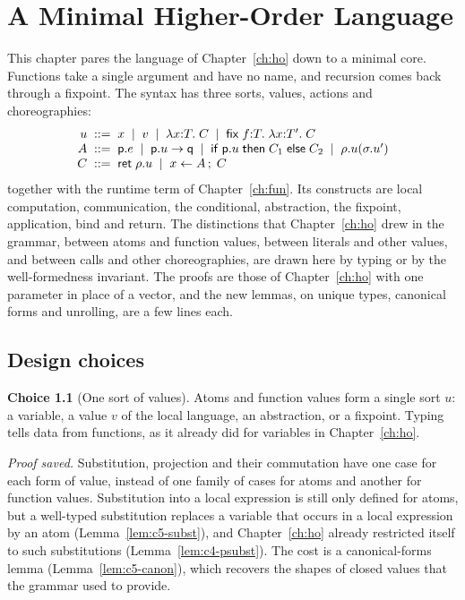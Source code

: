 \documentclass[11pt]{report}
\theoremstyle{plain}
\theoremstyle{definition}
\newtheorem{choice}{Choice}[chapter]
\theoremstyle{remark}
\newcommand{\kw}[1]{\mathsf{#1}}
\newcommand{\pp}{\mathsf{p}}
\newcommand{\qq}{\mathsf{q}}
\newcommand{\bind}[3]{#1 \leftarrow #2\,;\;#3}
\newcommand{\cret}[1]{\kw{ret}\;#1}
\newcommand{\com}[3]{#1.#2 \to #3}
\newcommand{\cif}[4]{\kw{if}\;#1.#2\;\kw{then}\;#3\;\kw{else}\;#4}
\newcommand{\clam}[3]{\lambda #1{:}#2.\;#3}
\newcommand{\cfix}[3]{\kw{fix}\;#1{:}#2.\;#3}
\begin{document}
\chapter{A Minimal Higher-Order Language}
\label{ch:min}

This chapter pares the language of Chapter~\ref{ch:ho} down to a minimal
core.  Functions take a single argument and have no name, and recursion
comes back through a fixpoint.  The syntax has three sorts, values, actions
and choreographies:
\[
\begin{array}{r@{\;\;}c@{\;\;}l}
  u & ::= & x \;\mid\; v \;\mid\; \clam{x}{T}{C} \;\mid\; \cfix{f}{T}{\clam{x}{T'}{C}}\\
  A & ::= & \pp.e \;\mid\; \com{\pp}{u}{\qq} \;\mid\; \cif{\pp}{u}{C_1}{C_2} \;\mid\; \rho.u(\sigma.u')\\
  C & ::= & \cret{\rho.u} \;\mid\; \bind{x}{A}{C}
\end{array}
\]
together with the runtime term of Chapter~\ref{ch:fun}.  Its constructs are
local computation, communication, the conditional, abstraction, the
fixpoint, application, bind and return.  The distinctions that
Chapter~\ref{ch:ho} drew in the grammar, between atoms and function values,
between literals and other values, and between calls and other
choreographies, are drawn here by typing or by the well-formedness
invariant.  The proofs are those of Chapter~\ref{ch:ho} with one parameter
in place of a vector, and the new lemmas, on unique types, canonical forms
and unrolling, are a few lines each.

\section{Design choices}
\label{sec:c5-choices}

\begin{choice}[One sort of values]\label{cho:c5-values}
  Atoms and function values form a single sort $u$: a variable, a value $v$
  of the local language, an abstraction, or a fixpoint.  Typing tells data
  from functions, as it already did for variables in Chapter~\ref{ch:ho}.

  \emph{Proof saved.}  Substitution, projection and their commutation have
  one case for each form of value, instead of one family of cases for atoms
  and another for function values.  Substitution into a local expression is
  still only defined for atoms, but a well-typed substitution replaces a
  variable that occurs in a local expression by an atom
  (Lemma~\ref{lem:c5-subst}), and Chapter~\ref{ch:ho} already restricted
  itself to such substitutions (Lemma~\ref{lem:c4-psubst}).  The cost is a
  canonical-forms lemma (Lemma~\ref{lem:c5-canon}), which recovers the
  shapes of closed values that the grammar used to provide.
\end{choice}
\end{document}
